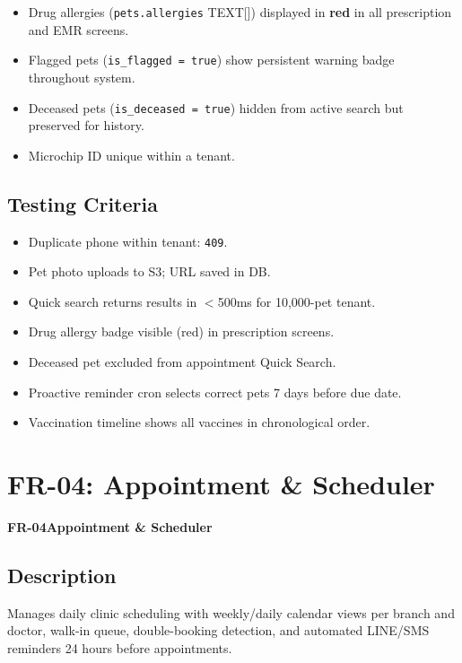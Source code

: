 \documentclass[12pt,a4paper]{report}
\newcommand{\testcheck}{\textcolor{successgreen}{\ding{51}}}
\newcommand{\moduleheader}[2]{%
  \par\vspace{6pt}%
  \noindent\colorbox{branddark}{\color{white}\textbf{\small #1}}\quad\textbf{\large #2}%
  \par\vspace{4pt}%
}
\begin{document}
\begin{itemize}
  \item Drug allergies (\texttt{pets.allergies} TEXT[]) displayed in \textbf{red} in all prescription and EMR screens.
  \item Flagged pets (\texttt{is\_flagged = true}) show persistent warning badge throughout system.
  \item Deceased pets (\texttt{is\_deceased = true}) hidden from active search but preserved for history.
  \item Microchip ID unique within a tenant.
\end{itemize}

\section{Testing Criteria}

\begin{itemize}
  \item[\testcheck] Duplicate phone within tenant: \texttt{409}.
  \item[\testcheck] Pet photo uploads to S3; URL saved in DB.
  \item[\testcheck] Quick search returns results in $<$500ms for 10,000-pet tenant.
  \item[\testcheck] Drug allergy badge visible (red) in prescription screens.
  \item[\testcheck] Deceased pet excluded from appointment Quick Search.
  \item[\testcheck] Proactive reminder cron selects correct pets 7 days before due date.
  \item[\testcheck] Vaccination timeline shows all vaccines in chronological order.
\end{itemize}

\chapter{FR-04: Appointment \& Scheduler}

\moduleheader{FR-04}{Appointment \& Scheduler}

\section{Description}

Manages daily clinic scheduling with weekly/daily calendar views per branch and doctor, walk-in queue, double-booking detection, and automated LINE/SMS reminders 24 hours before appointments.
\end{document}
